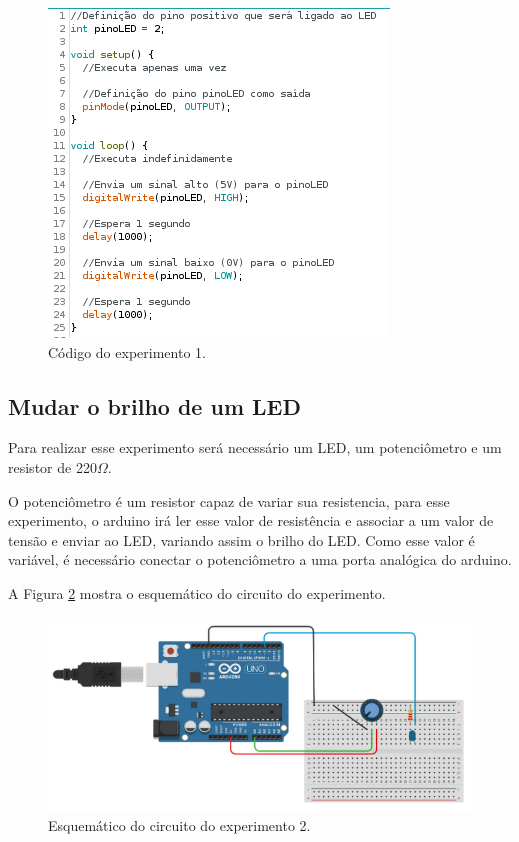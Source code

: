 \documentclass[12pt]{article}
\begin{document}
	\begin{figure}[h!]
		\centering
		\includegraphics[scale=0.8]{Imagens/Experimentos/1-PiscarLED/1-PiscarLEDcod.png}
		\caption{Código do experimento 1.}
		\label{figExp1PiscarLEDcod}
	\end{figure}

\subsection{Mudar o brilho de um LED}
	Para realizar esse experimento será necessário um LED, um potenciômetro e um resistor de 220$\Omega$.

	O potenciômetro é um resistor capaz de variar sua resistencia, para esse experimento, o arduino irá ler esse valor de resistência e associar a um valor de tensão e enviar ao LED, variando assim o brilho do LED. Como esse valor é variável, é necessário conectar o potenciômetro a uma porta analógica do arduino.

	A Figura \ref{figExp2BrilhoLEDesq} mostra o esquemático do circuito do experimento.

	\begin{figure}[h!]
		\centering
		\includegraphics[scale=0.4]{Imagens/Experimentos/2-brilhoLED/2-brilhoLEDesq.png}
		\caption{Esquemático do circuito do experimento 2.}
		\label{figExp2BrilhoLEDesq}
	\end{figure}
\end{document}
